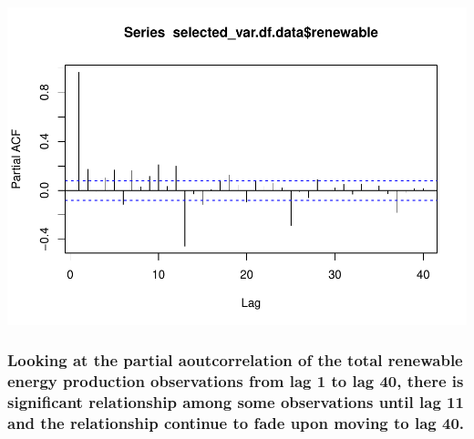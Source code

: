 \documentclass[
]{article}
\newenvironment{Shaded}{\begin{snugshade}}{\end{snugshade}}
\newcommand{\AttributeTok}[1]{\textcolor[rgb]{0.77,0.63,0.00}{#1}}
\newcommand{\ConstantTok}[1]{\textcolor[rgb]{0.00,0.00,0.00}{#1}}
\newcommand{\DecValTok}[1]{\textcolor[rgb]{0.00,0.00,0.81}{#1}}
\newcommand{\FunctionTok}[1]{\textcolor[rgb]{0.00,0.00,0.00}{#1}}
\newcommand{\NormalTok}[1]{#1}
\newcommand{\OtherTok}[1]{\textcolor[rgb]{0.56,0.35,0.01}{#1}}
\newcommand{\SpecialCharTok}[1]{\textcolor[rgb]{0.00,0.00,0.00}{#1}}
\begin{document}
\begin{Shaded}
\end{Shaded}

\includegraphics{YaredAsfaw_TSA_A02_Sp22_files/figure-latex/unnamed-chunk-22-1.pdf}

\hypertarget{looking-at-the-partial-aoutcorrelation-of-the-total-renewable-energy-production-observations-from-lag-1-to-lag-40-there-is-significant-relationship-among-some-observations-until-lag-11-and-the-relationship-continue-to-fade-upon-moving-to-lag-40.}{%
\subsubsection{Looking at the partial aoutcorrelation of the total
renewable energy production observations from lag 1 to lag 40, there is
significant relationship among some observations until lag 11 and the
relationship continue to fade upon moving to lag
40.}\label{looking-at-the-partial-aoutcorrelation-of-the-total-renewable-energy-production-observations-from-lag-1-to-lag-40-there-is-significant-relationship-among-some-observations-until-lag-11-and-the-relationship-continue-to-fade-upon-moving-to-lag-40.}}

\begin{Shaded}
\end{Shaded}
\end{document}
